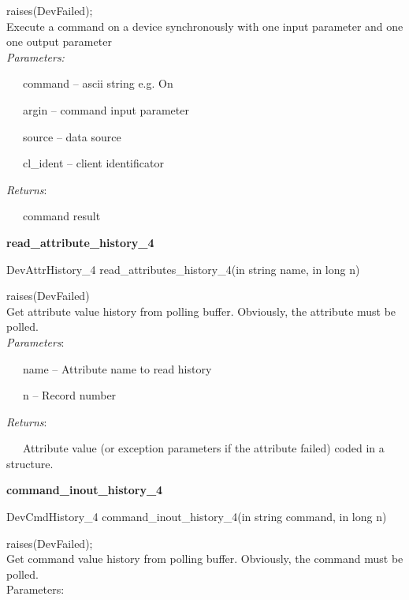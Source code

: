 raises(DevFailed);\\


Execute a command on a device synchronously with one input parameter
and one one output parameter\\


\emph{Parameters:}

~~~command -- ascii string e.g. \textquotedbl{}On\textquotedbl{}

~~~argin -- command input parameter

~~~source -- data source

~~~cl\_ident -- client identificator

\emph{Returns}:

~~~command result\\


\begin{flushleft}
\textbf{read\_attribute\_history\_4}
\par\end{flushleft}

DevAttrHistory\_4 read\_attributes\_history\_4(in string name, in
long n)

raises(DevFailed)\\


Get attribute value history from polling buffer. Obviously, the attribute
must be polled.\\


\emph{Parameters}:

~~~name -- Attribute name to read history

~~~n -- Record number

\emph{Returns}:

~~~Attribute value (or exception parameters if the attribute failed)
coded in a structure.\\


\begin{flushleft}
\textbf{command\_inout\_history\_4}
\par\end{flushleft}

DevCmdHistory\_4 command\_inout\_history\_4(in string command, in
long n)

raises(DevFailed);\\


Get command value history from polling buffer. Obviously, the command
must be polled.\\


Parameters:


